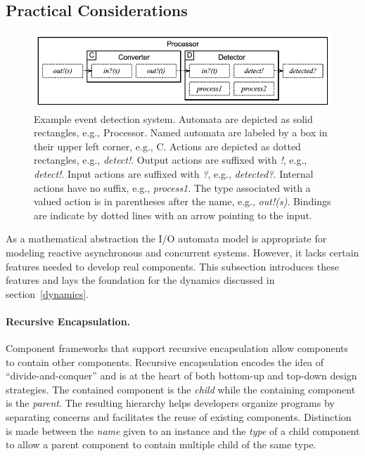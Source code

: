 \subsection{Practical Considerations}

\begin{figure}
\center
\includegraphics[width=\textwidth]{system_model}
\caption{Example event detection system.
  Automata are depicted as solid rectangles, e.g., Processor.
  Named automata are labeled by a box in their upper left corner, e.g., C.
  Actions are depicted as dotted rectangles, e.g., \emph{detect!}.
  Output actions are suffixed with \emph{!}, e.g., \emph{detect!}.
  Input actions are suffixed with \emph{?}, e.g., \emph{detected?}.
  Internal actions have no suffix, e.g., \emph{process1}.
  The type associated with a valued action is in parentheses after the name, e.g., \emph{out!(s)}.
  Bindings are indicate by dotted lines with an arrow pointing to the input.}
\label{sys_model}
\end{figure}

As a mathematical abstraction the I/O automata model is appropriate for modeling reactive asynchronous and concurrent systems.
However, it lacks certain features needed to develop real components.
This subsection introduces these features and lays the foundation for the dynamics discussed in section~\ref{dynamics}.

\paragraph{Recursive Encapsulation.}
Component frameworks that support recursive encapsulation allow components to contain other components.
Recursive encapsulation encodes the idea of ``divide-and-conquer'' and is at the heart of both bottom-up and top-down design strategies.
The contained component is the \emph{child} while the containing component is the \emph{parent}.
The resulting hierarchy helps developers organize programs by separating concerns and facilitates the reuse of existing components.
Distinction is made between the \emph{name} given to an instance and the \emph{type} of a child component to allow a parent component to contain multiple child of the same type.

